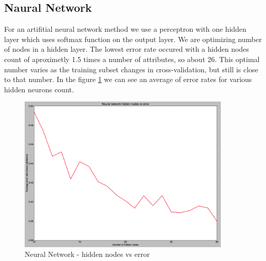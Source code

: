 \subsection{Naural Network}
For an artifitial neural network method we use a perceptron with one hidden layer which uses softmax function
on the output layer. We are optimizing number of nodes in a hidden layer. The lowest error rate occured with a
hidden nodes count of aproximetly 1.5 times a number of attributes, so about 26. This optimal number varies 
as the training subset changes in cross-validation, but still is close to that number. In the figure \ref{fig:NN_hiddennodes}
we can see an average of error rates for various hidden neurons count.
\begin{figure}[!tbh]
	\centering
	\includegraphics[width=0.9\textwidth]{figures/NN_hiddennodes}
	\caption{Neural Network - hidden nodes vs error}
	\label{fig:NN_hiddennodes}
\end{figure}

